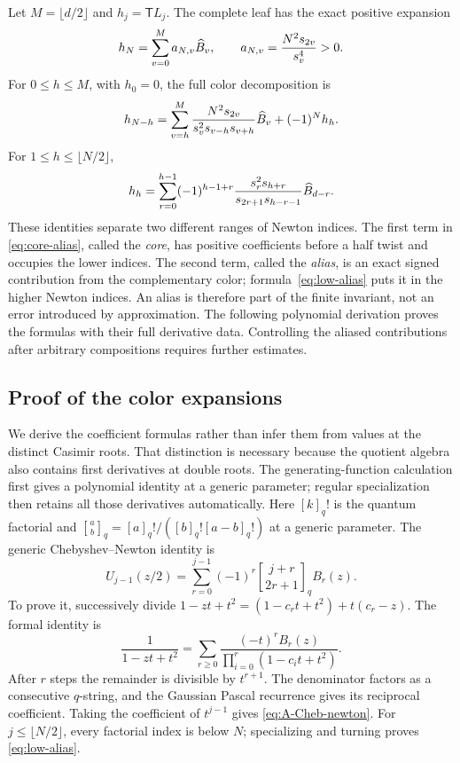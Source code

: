 \documentclass[11pt]{article}
\numberwithin{equation}{section}
\theoremstyle{definition}\newtheorem{definition}[theorem]{Definition}
\theoremstyle{remark}\newtheorem{remark}[theorem]{Remark}
\newcommand{\Turn}{\mathsf T}\newcommand{\Cheb}{\mathsf C}
\begin{document}
Let $M=\lfloor d/2\rfloor$ and $h_j=\Turn L_j$. The complete leaf has the exact positive expansion
\begin{equation}\label{eq:complete-leaf}
 h_N=\sum_{v=0}^{M}a_{N,v}\widehat B_v,
 \qquad a_{N,v}=\frac{N^2s_{2v}}{s_v^4}>0.
\end{equation}
For $0\le h\le M$, with $h_0=0$, the full color decomposition is
\begin{equation}\label{eq:core-alias}
 h_{N-h}=\sum_{v=h}^{M}
 \frac{N^2s_{2v}}{s_v^2s_{v-h}s_{v+h}}\widehat B_v+(-1)^Nh_h.
\end{equation}
For $1\le h\le\lfloor N/2\rfloor$,
\begin{equation}\label{eq:low-alias}
 h_h=\sum_{r=0}^{h-1}(-1)^{h-1+r}
 \frac{s_r^2s_{h+r}}{s_{2r+1}s_{h-r-1}}\widehat B_{d-r}.
\end{equation}
These identities separate two different ranges of Newton indices. The first term in \eqref{eq:core-alias}, called the \emph{core}, has positive coefficients before a half twist and occupies the lower indices. The second term, called the \emph{alias}, is an exact signed contribution from the complementary color; formula~\eqref{eq:low-alias} puts it in the higher Newton indices. An alias is therefore part of the finite invariant, not an error introduced by approximation. The following polynomial derivation proves the formulas with their full derivative data. Controlling the aliased contributions after arbitrary compositions requires further estimates.

\subsection{Proof of the color expansions}
We derive the coefficient formulas rather than infer them from values at the distinct Casimir roots. That distinction is necessary because the quotient algebra also contains first derivatives at double roots. The generating-function calculation first gives a polynomial identity at a generic parameter; regular specialization then retains all those derivatives automatically.
Here $[k]_q!$ is the quantum factorial and $\genfrac{[}{]}{0pt}{}{a}{b}_q=[a]_q!/([b]_q![a-b]_q!)$ at a generic parameter. The generic Chebyshev--Newton identity is
\begin{equation}\label{eq:A-Cheb-newton}
 U_{j-1}(z/2)=\sum_{r=0}^{j-1}(-1)^r
 \genfrac{[}{]}{0pt}{}{j+r}{2r+1}_q B_r(z).
\end{equation}
To prove it, successively divide
$1-zt+t^2=(1-c_rt+t^2)+t(c_r-z)$. The formal identity is
\[
 \frac1{1-zt+t^2}
 =\sum_{r\ge0}\frac{(-t)^rB_r(z)}{\prod_{i=0}^{r}(1-c_it+t^2)}.
\]
After $r$ steps the remainder is divisible by $t^{r+1}$. The denominator factors as a consecutive $q$-string, and the Gaussian Pascal recurrence gives its reciprocal coefficient. Taking the coefficient of $t^{j-1}$ gives \eqref{eq:A-Cheb-newton}. For $j\le\lfloor N/2\rfloor$, every factorial index is below $N$; specializing and turning proves \eqref{eq:low-alias}.
\end{document}
